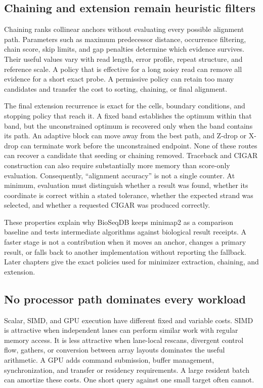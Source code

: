 \subsection{Chaining and extension remain heuristic filters}

Chaining ranks collinear anchors without evaluating every possible
alignment path.  Parameters such as maximum predecessor distance,
occurrence filtering, chain score, skip limits, and gap penalties
determine which evidence survives.  Their useful values vary with read
length, error profile, repeat structure, and reference scale.  A policy
that is effective for a long noisy read can remove all evidence for a
short exact probe.  A permissive policy can retain too many candidates
and transfer the cost to sorting, chaining, or final alignment.

The final extension recurrence is exact for the cells, boundary conditions,
and stopping policy that reach it.  A fixed band establishes the optimum
within that band, but the unconstrained optimum is recovered only when the
band contains its path.  An adaptive block can move away from the best path,
and Z-drop or X-drop can terminate work before the unconstrained endpoint.
None of these routes can recover a candidate that seeding or chaining
removed.  Traceback and CIGAR
construction can also require substantially more memory than score-only
evaluation.  Consequently, ``alignment accuracy'' is not a single
counter.  At minimum, evaluation must distinguish whether a result was
found, whether its coordinate is correct within a stated tolerance,
whether the expected strand was selected, and whether a requested CIGAR
was produced correctly.

These properties explain why BioSeqDB keeps minimap2 as a comparison
baseline and tests intermediate algorithms against biological result
receipts.  A faster stage is not a contribution when it moves an anchor,
changes a primary result, or falls back to another implementation without
reporting the fallback.  Later chapters give the exact policies used for
minimizer extraction, chaining, and extension.

\subsection{No processor path dominates every workload}

Scalar, SIMD, and GPU execution have different fixed and variable costs.
SIMD is attractive when independent lanes can perform similar work with
regular memory access.  It is less attractive when lane-local rescans,
divergent control flow, gathers, or conversion between array layouts
dominates the useful arithmetic.  A GPU adds command submission, buffer
management, synchronization, and transfer or residency requirements.  A
large resident batch can amortize these costs.  One short query against
one small target often cannot.

